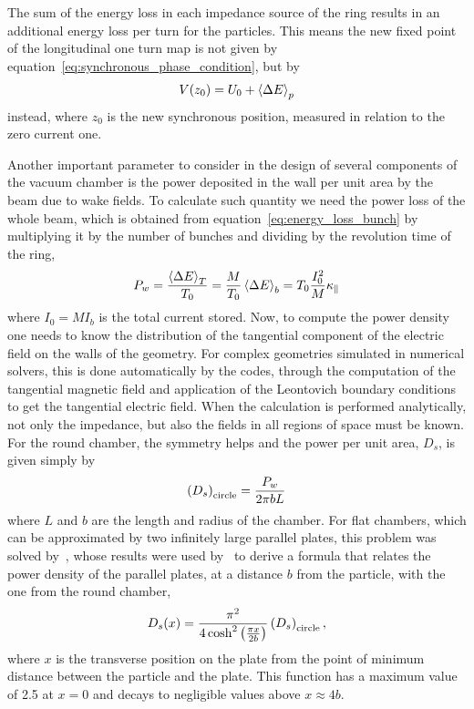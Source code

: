     The sum of the energy loss in each impedance source of the ring results in an additional energy loss per turn for the particles. This means the new fixed point of the longitudinal one turn map is not given by equation~\eqref{eq:synchronous_phase_condition}, but by
    \begin{align}
        V(z_0) = U_0 + \average[p]{\Delta E}
    \end{align}
    instead, where $z_0$ is the new synchronous position, measured in relation to the zero current one.

    Another important parameter to consider in the design of several components of the vacuum chamber is the power deposited in the wall per unit area by the beam due to wake fields. To calculate such quantity we need the power loss of the whole beam, which is obtained from equation~\eqref{eq:energy_loss_bunch} by multiplying it by the number of bunches and dividing by the revolution time of the ring,
    \begin{align}\label{eq:total_power}
        P_w = \frac{\average[T]{\Delta E}}{T_0} = \frac{M}{T_0}\average[b]{\Delta E} =
        T_0\frac{I_0^2}{M}\kappa_\parallel
    \end{align}
    where $I_0=MI_b$ is the total current stored. Now, to compute the power density one needs to know the distribution of the tangential component of the electric field on the walls of the geometry. For complex geometries simulated in numerical solvers, this is done automatically by the codes, through the computation of the tangential magnetic field and application of the Leontovich boundary conditions~\cite[pp. 280]{Landau1961} to get the tangential electric field. When the calculation is performed analytically, not only the impedance, but also the fields in all regions of space must be known. For the round chamber, the symmetry helps and the power per unit area, $D_s$, is given simply by
    \begin{align}\label{eq:power_density_circle}
        \fof{D_s}_\text{circle} = \frac{P_w}{2\pi b L}
    \end{align}
    where $L$ and $b$ are the length and radius of the chamber. For flat chambers, which can be approximated by two infinitely large parallel plates, this problem was solved by~, whose results were used by~ to derive a formula that relates the power density of the parallel plates, at a distance $b$ from the particle, with the one from the round chamber,
    \begin{align}\label{eq:power_density_flat}
        D_s(x) = \frac{\pi^2}{4\cosh^2\fof{\frac{\pi x}{2b}}}\fof{D_s}_\text{circle},
    \end{align}
    where $x$ is the transverse position on the plate from the point of minimum distance between the particle and the plate. This function has a maximum value of \SI{2.5}{} at $x=0$ and decays to negligible values above $x\approx4b$.


